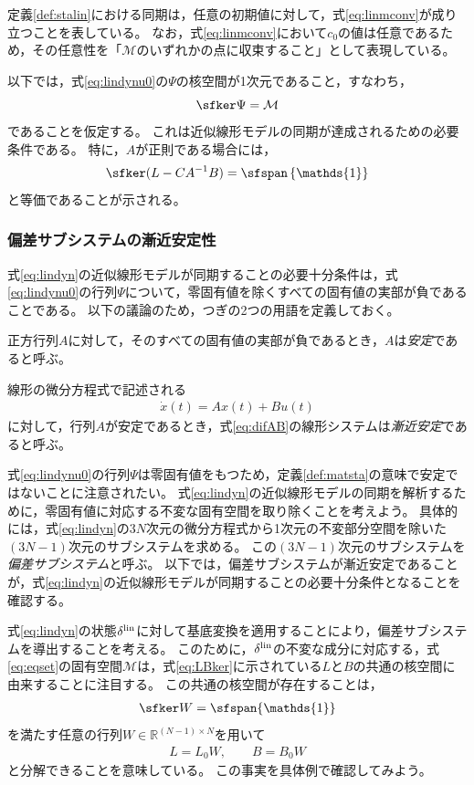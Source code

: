 \documentclass[tombow,dvipdfmx]{corona-a5}
\begin{document}
定義\ref{def:stalin}における同期は，任意の初期値に対して，式\ref{eq:linmconv}が成り立つことを表している。
なお，式\ref{eq:linmconv}において$c_0$の値は任意であるため，その任意性を「$\mathcal{M}$のいずれかの点に収束すること」として表現している。

以下では，式\ref{eq:lindynu0}の$\Psi$の核空間が1次元であること，すなわち，
\[
\sfker \Psi = \mathcal{M}
\]
であることを仮定する。
これは近似線形モデルの同期が達成されるための必要条件である。
特に，$A$が正則である場合には，
\begin{align}\label{eq:nescon}
\sfker (L-CA^{-1}B) = \sfspan
\left\{
\mathds{1}
\right\}
\end{align}
と等価であることが示される。


\subsubsection{偏差サブシステムの漸近安定性}

式\ref{eq:lindyn}の近似線形モデルが同期することの必要十分条件は，式\ref{eq:lindynu0}の行列$\Psi$について，零固有値を除くすべての固有値の実部が負であることである。
以下の議論のため，つぎの2つの用語を定義しておく。

\begin{定義}[正方行列の安定性]
\label{def:matsta}
正方行列$A$に対して，そのすべての固有値の実部が負であるとき，$A$は\emph{安定}であると呼ぶ。
\end{定義}

\begin{定義}[線形システムの漸近安定性]
\label{def:difsta}
線形の微分方程式で記述される
\begin{align}\label{eq:difAB}
\dot{x}(t)=Ax(t) +Bu(t)
\end{align}
に対して，行列$A$が安定であるとき，式\ref{eq:difAB}の線形システムは\emph{漸近安定}であると呼ぶ。
\end{定義}

式\ref{eq:lindynu0}の行列$\Psi$は零固有値をもつため，定義\ref{def:matsta}の意味で安定ではないことに注意されたい。
式\ref{eq:lindyn}の近似線形モデルの同期を解析するために，零固有値に対応する不変な固有空間を取り除くことを考えよう。
具体的には，式\ref{eq:lindyn}の$3N$次元の微分方程式から1次元の不変部分空間を除いた$(3N-1)$次元のサブシステムを求める。
この$(3N-1)$次元のサブシステムを\emph{偏差サブシステム}と呼ぶ。
以下では，偏差サブシステムが漸近安定であることが，式\ref{eq:lindyn}の近似線形モデルが同期することの必要十分条件となることを確認する。

式\ref{eq:lindyn}の状態$\delta^{\rm lin}$に対して基底変換を適用することにより，偏差サブシステムを導出することを考える。
このために，$\delta^{\rm lin}$の不変な成分に対応する，式\ref{eq:eqset}の固有空間$\mathcal{M}$は，式\ref{eq:LBker}に示されている$L$と$B$の共通の核空間に由来することに注目する。
この共通の核空間が存在することは，
\begin{align}\label{eq:sfkerW}
\sfker W = \sfspan\{ \mathds{1}\}
\end{align}
を満たす任意の行列$W \in \mathbb{R}^{(N-1)\times N}$を用いて
\begin{align}\label{eq:decLB}
L = L_0 W 
,\qquad
B = B_0 W 
\end{align}
と分解できることを意味している。
この事実を具体例で確認してみよう。
\end{document}
